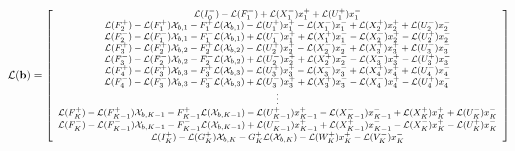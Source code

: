 \begin{adjustwidth}{-.5in}{-.5in}
\begin{equation}
\footnotesize
\mathcal{L}(\mathbf{b}) =
\left[
\begin{array}{c}
\mathcal{L}(I^{-}_{0}) - \mathcal{L}(F^{-}_{1}) + \mathcal{L}(X^{-}_{1})x^{+}_{1} + \mathcal{L}(U^{+}_{1})x^{-}_{1}  \\
\mathcal{L}(F^{+}_{2}) - \mathcal{L}(F^{+}_{1}) \mathcal{X}_{b,1} - F^{+}_{1} \mathcal{L}(\mathcal{X}_{b,1}) - \mathcal{L}(U^{+}_{1})x^{+}_{1} - \mathcal{L}(X^{-}_{1})x^{-}_{1} + \mathcal{L}(X^{+}_{2})x^{+}_{2} + \mathcal{L}(U^{-}_{2})x^{-}_{2} \\
\mathcal{L}(F^{-}_{2}) - \mathcal{L}(F^{-}_{1}) \mathcal{X}_{b,1} - F^{-}_{1} \mathcal{L}(\mathcal{X}_{b,1}) + \mathcal{L}(U^{-}_{1})x^{+}_{1} + \mathcal{L}(X^{+}_{1})x^{-}_{1} - \mathcal{L}(X^{-}_{2})x^{+}_{2} - \mathcal{L}(U^{+}_{2})x^{-}_{2} \\
\mathcal{L}(F^{+}_{3}) - \mathcal{L}(F^{+}_{2}) \mathcal{X}_{b,2} - F^{+}_{2} \mathcal{L}(\mathcal{X}_{b,2}) - \mathcal{L}(U^{+}_{2})x^{+}_{2} - \mathcal{L}(X^{-}_{2})x^{-}_{2} + \mathcal{L}(X^{+}_{3})x^{+}_{3} + \mathcal{L}(U^{-}_{3})x^{-}_{3} \\
\mathcal{L}(F^{-}_{3}) - \mathcal{L}(F^{-}_{2}) \mathcal{X}_{b,2} - F^{-}_{2} \mathcal{L}(\mathcal{X}_{b,2}) + \mathcal{L}(U^{-}_{2})x^{+}_{2} + \mathcal{L}(X^{+}_{2})x^{-}_{2} - \mathcal{L}(X^{-}_{3})x^{+}_{3} - \mathcal{L}(U^{+}_{3})x^{-}_{3} \\
\mathcal{L}(F^{+}_{4}) - \mathcal{L}(F^{+}_{3}) \mathcal{X}_{b,3} - F^{+}_{3} \mathcal{L}(\mathcal{X}_{b,3}) - \mathcal{L}(U^{+}_{3})x^{+}_{3} - \mathcal{L}(X^{-}_{3})x^{-}_{3} + \mathcal{L}(X^{+}_{4})x^{+}_{4} + \mathcal{L}(U^{-}_{4})x^{-}_{4} \\
\mathcal{L}(F^{-}_{4}) - \mathcal{L}(F^{-}_{3}) \mathcal{X}_{b,3} - F^{-}_{3} \mathcal{L}(\mathcal{X}_{b,3}) + \mathcal{L}(U^{-}_{3})x^{+}_{3} + \mathcal{L}(X^{+}_{3})x^{-}_{3} - \mathcal{L}(X^{-}_{4})x^{+}_{4} - \mathcal{L}(U^{+}_{4})x^{-}_{4} \\
\vdots \\
\mathcal{L}(F^{+}_{K}) - \mathcal{L}(F^{+}_{K-1}) \mathcal{X}_{b,K-1} - F^{+}_{K-1} \mathcal{L}(\mathcal{X}_{b,K-1}) - \mathcal{L}(U^{+}_{K-1})x^{+}_{K-1} - \mathcal{L}(X^{-}_{K-1})x^{-}_{K-1} + \mathcal{L}(X^{+}_{K})x^{+}_{K} + \mathcal{L}(U^{-}_{K})x^{-}_{K} \\
\mathcal{L}(F^{-}_{K}) - \mathcal{L}(F^{-}_{K-1}) \mathcal{X}_{b,K-1} - F^{-}_{K-1} \mathcal{L}(\mathcal{X}_{b,K-1}) + \mathcal{L}(U^{-}_{K-1})x^{+}_{K-1} + \mathcal{L}(X^{+}_{K-1})x^{-}_{K-1} - \mathcal{L}(X^{-}_{K})x^{+}_{K} - \mathcal{L}(U^{+}_{K})x^{-}_{K} \\
\mathcal{L}(I^{+}_{K}) - \mathcal{L}(G^{+}_{K}) \mathcal{X}_{b,K} - G^{+}_{K} \mathcal{L}(\mathcal{X}_{b,K}) - \mathcal{L}(W^{+}_{K})x^{+}_{K} - \mathcal{L}(V^{-}_{K})x^{-}_{K} \\
\end{array}
\right]
\label{eq:eigen_bvp-tangent_linear-b}
\end{equation}
\end{adjustwidth}


